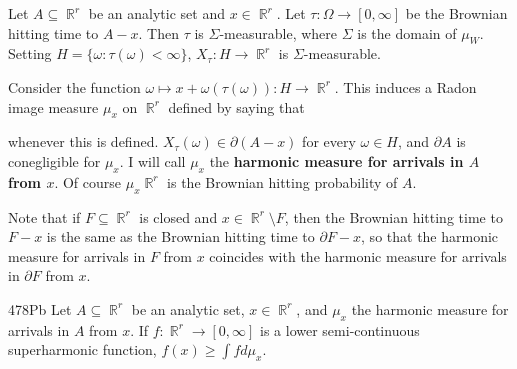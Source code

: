 Let $A\subseteq\BbbR^r$ be an analytic
set and $x\in\BbbR^r$.   Let $\tau:\Omega\to[0,\infty]$ be the Brownian
hitting time to $A-x$.   Then $\tau$ is
$\Sigma$-measurable, where $\Sigma$ is the domain of
$\mu_W$.   Setting $H=\{\omega:\tau(\omega)<\infty\}$,
$X_{\tau}:H\to\BbbR^r$ is $\Sigma$-measurable.

Consider the function
$\omega\mapsto x+\omega(\tau(\omega)):H\to\BbbR^r$.
This induces a Radon image measure $\mu_x$ on $\BbbR^r$ defined by saying
that


\noindent whenever this is defined.    $X_{\tau}(\omega)\in\partial(A-x)$ for every $\omega\in H$,
and $\partial A$ is conegligible for $\mu_x$.   I will call $\mu_x$ the
{\bf harmonic measure for arrivals in $A$ from $x$}.   Of course
$\mu_x\BbbR^r$ is the Brownian hitting probability of $A$.

Note that if $F\subseteq\BbbR^r$ is closed and $x\in\BbbR^r\setminus F$,
then the Brownian hitting time to $F-x$ is the same as the Brownian hitting
time to $\partial F-x$,
so that the harmonic measure for arrivals in $F$
from $x$ coincides with the harmonic measure for arrivals in $\partial F$
from $x$.

\spheader 478Pb   Let
$A\subseteq\BbbR^r$ be an analytic set, $x\in\BbbR^r$, and $\mu_x$
the harmonic measure for arrivals in $A$ from $x$.   If
$f:\BbbR^r\to[0,\infty]$ is a lower semi-continuous superharmonic function,
$f(x)\ge\int fd\mu_x$.   

